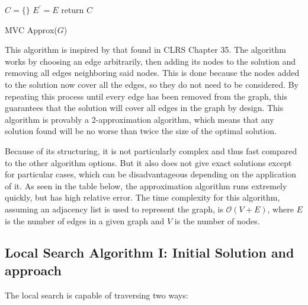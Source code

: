 \begin{algorithm}[ht]
\SetAlgoNoLine
$C = \{ \}$\;
$E^{\prime}= E$\;
return $C$\;
\caption{MVC Approx($G$)}
\label{alg:one}
\end{algorithm}

This algorithm is inspired by that found in CLRS Chapter 35. The algorithm works by choosing an edge arbitrarily, then adding its nodes to the solution and removing all edges neighboring said nodes. This is done because the nodes added to the solution now cover all the edges, so they do not need to be considered. By repeating this process until every edge has been removed from the graph, this guarantees that the solution will cover all edges in the graph by design. This algorithm is provably a 2-approximation algorithm, which means that any solution found will be no worse than twice the size of the optimal solution. 

Because of its structuring, it is not particularly complex and thus fast compared to the other algorithm options. But it also does not give exact solutions except for particular cases, which can be disadvantageous depending on the application of it. As seen in the table below, the approximation algorithm runs extremely quickly, but has high relative error. The time complexity for this algorithm, assuming an adjacency list is used to represent the graph, is $\mathcal{O}(V +E)$, where $E$ is the number of edges in a given graph and $V$ is the number of nodes. 
\subsection{Local Search Algorithm I: Initial Solution and approach}
The local search is capable of traversing two ways:

